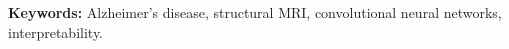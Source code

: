 \begin{abstract}
This document describes the methodology of the project: how the structural
MRI data is handled, from acquisition to model-ready tensors, and how the
convolutional architectures are designed and trained.
\end{abstract}

\noindent\textbf{Keywords:} Alzheimer's disease, structural MRI, convolutional neural networks, interpretability.
